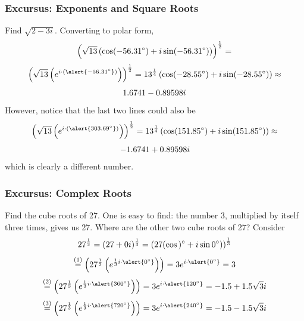 \documentclass[xcolor=dvipsnames]{beamer}
\begin{document}
\begin{frame}
  \frametitle{Excursus: Exponents and Square Roots}
   Find $\sqrt{2-3i}$. Converting to polar form,
  \begin{equation}
    \label{eq:etahmohy}
    \left(\sqrt{13}\left(\cos(-56.31^{\circ})+i\sin(-56.31^{\circ})\right)\right)^{\frac{1}{2}}=\notag
  \end{equation}
  \begin{equation}
    \label{eq:thueceij}
    \left(\sqrt{13}\left(e^{i\cdot{}(\alert{-56.31^{\circ}})}\right)\right)^{\frac{1}{2}}=13^{\frac{1}{4}}\left(\cos(-28.55^{\circ})+i\sin(-28.55^{\circ})\right)\approx\notag
  \end{equation}
  \begin{equation}
    \label{eq:puxiengo}
    1.6741-0.89598i\notag
  \end{equation}
  However, notice that the last two lines could also be
  \begin{equation}
    \label{eq:guwohdoh}
    \left(\sqrt{13}\left(e^{i\cdot{}(\alert{303.69^{\circ}})}\right)\right)^{\frac{1}{2}}=13^{\frac{1}{4}}\left(\cos(151.85^{\circ})+i\sin(151.85^{\circ})\right)\approx\notag
  \end{equation}
  \begin{equation}
    \label{eq:jahwiebo}
    -1.6741+0.89598i\notag
  \end{equation}
  which is clearly a different number.
\end{frame}

\begin{frame}
  \frametitle{Excursus: Complex Roots}
 Find the cube roots of 27. One is easy to
find: the number 3, multiplied by itself three times, gives us 27.
Where are the other two cube roots of 27? Consider
\begin{equation}
  \label{eq:eecohghu}
  27^{\frac{1}{3}}=(27+0i)^{\frac{1}{3}}=\left(27(\cos{})^{\circ}+i\sin{}0^{\circ})\right)^{\frac{1}{3}}\notag
\end{equation}
\begin{equation}
  \label{eq:vuphahdo}
  \overset{(1)}{=}\left(27^{\frac{1}{3}}\left(e^{\frac{1}{3}i\cdot{}\alert{0^{\circ}}}\right)\right)=3e^{i\cdot{}\alert{0^{\circ}}}=3\notag
\end{equation}
\begin{equation}
  \label{eq:yudiesoo}
  \overset{(2)}{=}\left(27^{\frac{1}{3}}\left(e^{\frac{1}{3}i\cdot{}\alert{360^{\circ}}}\right)\right)=3e^{i\cdot{}\alert{120^{\circ}}}=-1.5+1.5\sqrt{3}i\notag
\end{equation}
\begin{equation}
  \label{eq:vaimetha}
  \overset{(3)}{=}\left(27^{\frac{1}{3}}\left(e^{\frac{1}{3}i\cdot{}\alert{720^{\circ}}}\right)\right)=3e^{i\cdot{}\alert{240^{\circ}}}=-1.5-1.5\sqrt{3}i\notag
\end{equation}
\end{frame}
\end{document}
